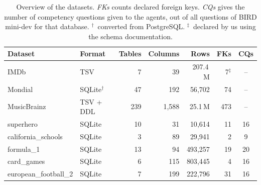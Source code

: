 \begin{table}[!htbp]
  \centering
  \footnotesize
  \renewcommand{\arraystretch}{1.3}
  \setlength{\tabcolsep}{5pt}
  \begin{tabular}{l l r r r r c}
    \hline
    \textbf{Dataset} & \textbf{Format} & \textbf{Tables} & \textbf{Columns} & \textbf{Rows} & \textbf{FKs} & \textbf{CQs} \\
    \hline
    IMDb                  & TSV                  & 7   & 39      & 207.4\,M   & 7\(^{\ddagger}\) & -- \\
    Mondial               & SQLite\(^{\dagger}\) & 47  & 192     & 56{,}702   & 74  & -- \\
    MusicBrainz           & TSV + DDL            & 239 & 1{,}588 & 25.1\,M    & 473 & -- \\
    \hline
    superhero             & SQLite               & 10  & 31      & 10{,}614   & 11  & 16 \\
    california\_schools   & SQLite               & 3   & 89      & 29{,}941   & 2   & 9 \\
    formula\_1            & SQLite               & 13  & 94      & 493{,}257  & 19  & 20 \\
    card\_games           & SQLite               & 6   & 115     & 803{,}445  & 4   & 16 \\
    european\_football\_2 & SQLite               & 7   & 199     & 222{,}796  & 31  & 16 \\
    \hline
  \end{tabular}
  \caption[Overview of the datasets]{Overview of the datasets. \emph{FKs} counts declared foreign keys. \emph{CQs} gives the number of competency questions given to the agents, out of all questions of BIRD mini-dev for that database. \(^{\dagger}\)~converted from PostgreSQL. \(^{\ddagger}\)~declared by us using the schema documentation.}
  \label{tab:datasets}
\end{table}


